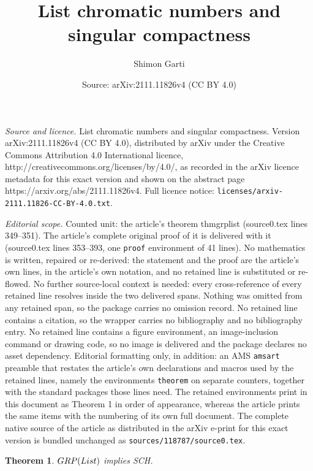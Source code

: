 \documentclass[10pt,a4paper]{amsart}
\title{List chromatic numbers and singular compactness}
\author{Shimon Garti}
\date{Source: arXiv:2111.11826v4 (CC BY 4.0)}
\newtheorem{theorem}{Theorem}
\begin{document}
\maketitle

\noindent\emph{Source and licence.} List chromatic numbers and singular compactness. Version arXiv:2111.11826v4 (CC BY 4.0), distributed by arXiv under the Creative Commons Attribution 4.0 International licence, http://creativecommons.org/licenses/by/4.0/, as recorded in the arXiv licence metadata for this exact version and shown on the abstract page https://arxiv.org/abs/2111.11826v4. Full licence notice: \texttt{licenses/arxiv-2111.11826-CC-BY-4.0.txt}.\par\smallskip

\noindent\textit{Editorial scope.} Counted unit: the article's theorem thmgrplist (source0.tex lines 349--351). The article's complete original proof of it is delivered with it (source0.tex lines 353--393, one \texttt{proof} environment of 41 lines). No mathematics is written, repaired or re-derived: the statement and the proof are the article's own lines, in the article's own notation, and no retained line is substituted or re-flowed.  No further source-local context is needed: every cross-reference of every retained line resolves inside the two delivered spans.  Nothing was omitted from any retained span, so the package carries no omission record.  No retained line contains a citation, so the wrapper carries no bibliography and no bibliography entry.  No retained line contains a figure environment, an image-inclusion command or drawing code, so no image is delivered and the package declares no asset dependency.  Editorial formatting only, in addition: an AMS \texttt{amsart} preamble that restates the article's own declarations and macros used by the retained lines, namely the environments \texttt{theorem} on separate counters, together with the standard packages those lines need.  The retained environments print in this document as Theorem 1 in order of appearance, whereas the article prints the same items with the numbering of its own full document.  The complete native source of the article as distributed in the arXiv e-print for this exact version is bundled unchanged as \texttt{sources/118787/source0.tex}.
\begin{theorem}
\label{thmgrplist} ${\rm GRP}({\rm List})$ implies SCH.
\end{theorem}
\end{document}
